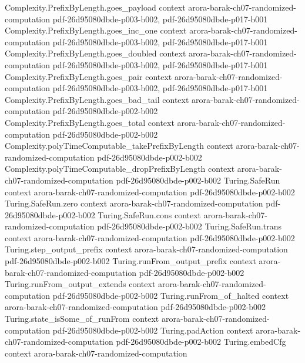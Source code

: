 \begin{theorem}
\proofstep
  {Complexity.PrefixByLength.goes_payload}
  {context}
  {arora-barak-ch07-randomized-computation}
  {pdf-26d95080dbde-p003-b002,
    pdf-26d95080dbde-p017-b001}
\proofstep
  {Complexity.PrefixByLength.goes_inc_one}
  {context}
  {arora-barak-ch07-randomized-computation}
  {pdf-26d95080dbde-p003-b002,
    pdf-26d95080dbde-p017-b001}
\proofstep
  {Complexity.PrefixByLength.goes_doubled}
  {context}
  {arora-barak-ch07-randomized-computation}
  {pdf-26d95080dbde-p003-b002,
    pdf-26d95080dbde-p017-b001}
\proofstep
  {Complexity.PrefixByLength.goes_pair}
  {context}
  {arora-barak-ch07-randomized-computation}
  {pdf-26d95080dbde-p003-b002,
    pdf-26d95080dbde-p017-b001}
\proofstep
  {Complexity.PrefixByLength.goes_bad_tail}
  {context}
  {arora-barak-ch07-randomized-computation}
  {pdf-26d95080dbde-p002-b002}
\proofstep
  {Complexity.PrefixByLength.goes_total}
  {context}
  {arora-barak-ch07-randomized-computation}
  {pdf-26d95080dbde-p002-b002}
\proofstep
  {Complexity.polyTimeComputable_takePrefixByLength}
  {context}
  {arora-barak-ch07-randomized-computation}
  {pdf-26d95080dbde-p002-b002}
\proofstep
  {Complexity.polyTimeComputable_dropPrefixByLength}
  {context}
  {arora-barak-ch07-randomized-computation}
  {pdf-26d95080dbde-p002-b002}
\proofstep
  {Turing.SafeRun}
  {context}
  {arora-barak-ch07-randomized-computation}
  {pdf-26d95080dbde-p002-b002}
\proofstep
  {Turing.SafeRun.zero}
  {context}
  {arora-barak-ch07-randomized-computation}
  {pdf-26d95080dbde-p002-b002}
\proofstep
  {Turing.SafeRun.cons}
  {context}
  {arora-barak-ch07-randomized-computation}
  {pdf-26d95080dbde-p002-b002}
\proofstep
  {Turing.SafeRun.trans}
  {context}
  {arora-barak-ch07-randomized-computation}
  {pdf-26d95080dbde-p002-b002}
\proofstep
  {Turing.step_output_prefix}
  {context}
  {arora-barak-ch07-randomized-computation}
  {pdf-26d95080dbde-p002-b002}
\proofstep
  {Turing.runFrom_output_prefix}
  {context}
  {arora-barak-ch07-randomized-computation}
  {pdf-26d95080dbde-p002-b002}
\proofstep
  {Turing.runFrom_output_extends}
  {context}
  {arora-barak-ch07-randomized-computation}
  {pdf-26d95080dbde-p002-b002}
\proofstep
  {Turing.runFrom_of_halted}
  {context}
  {arora-barak-ch07-randomized-computation}
  {pdf-26d95080dbde-p002-b002}
\proofstep
  {Turing.state_isSome_of_runFrom}
  {context}
  {arora-barak-ch07-randomized-computation}
  {pdf-26d95080dbde-p002-b002}
\proofstep
  {Turing.padAction}
  {context}
  {arora-barak-ch07-randomized-computation}
  {pdf-26d95080dbde-p002-b002}
\proofstep
  {Turing.embedCfg}
  {context}
  {arora-barak-ch07-randomized-computation}

\end{theorem}
